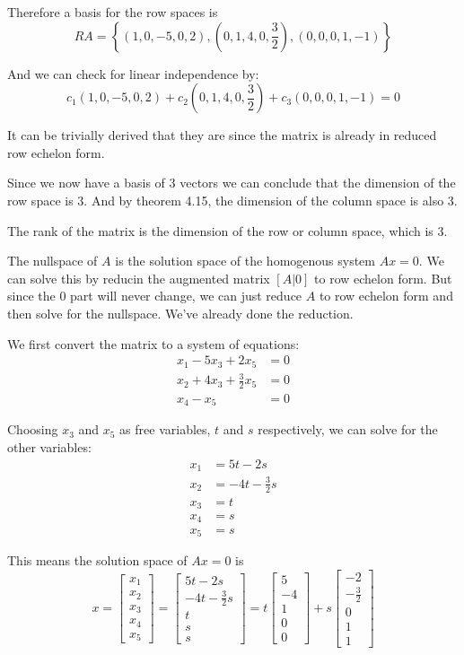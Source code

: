 Therefore a basis for the row spaces is
$$
	RA = \left\{(1,0,-5,0,2), \left(0,1,4,0,\frac{3}{2}\right), (0,0,0,1,-1)\right\}
$$

And we can check for linear independence by:
$$
	c_1(1,0,-5,0,2) + c_2\left(0,1,4,0,\frac{3}{2}\right) + c_3(0,0,0,1,-1) = 0
$$

It can be trivially derived that they are since the matrix is already in reduced row echelon form.

Since we now have a basis of 3 vectors we can conclude that the dimension of the row space is 3. And by theorem 4.15, the dimension of the column space is also 3.

The rank of the matrix is the dimension of the row or column space, which is 3.

The nullspace of $A$ is the solution space of the homogenous system $Ax = 0$. We can solve this by reducin the augmented matrix $[A|0]$ to row echelon form. But since the 0 part will never change, we can just reduce $A$ to row echelon form and then solve for the nullspace. We've already done the reduction.

We first convert the matrix to a system of equations:
\begin{align*}
	x_1 - 5x_3 + 2x_5           & = 0 \\
	x_2 + 4x_3 + \frac{3}{2}x_5 & = 0 \\
	x_4 - x_5                   & = 0
\end{align*}

Choosing $x_3$ and $x_5$ as free variables, $t$ and $s$ respectively, we can solve for the other variables:
\begin{align*}
	x_1 & = 5t - 2s            \\
	x_2 & = -4t - \frac{3}{2}s \\
	x_3 & = t                  \\
	x_4 & = s                  \\
	x_5 & = s
\end{align*}

This means the solution space of $Ax = 0$ is
$$
	x = \begin{bmatrix}x_1\\x_2\\x_3\\x_4\\x_5\end{bmatrix}=\begin{bmatrix}5t - 2s\\-4t - \frac{3}{2}s\\t\\s\\s\end{bmatrix}=t\begin{bmatrix}5\\-4\\1\\0\\0\end{bmatrix}+s\begin{bmatrix}-2\\-\frac{3}{2}\\0\\1\\1\end{bmatrix}
$$

